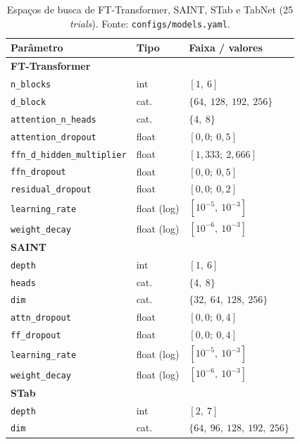 \begin{table}[htbp]
\centering\footnotesize
\caption[Espaços de busca --- arquiteturas de atenção]{Espaços de
busca de FT-Transformer, SAINT, STab e TabNet (25 \emph{trials}).
Fonte: \texttt{configs/\allowbreak models.\allowbreak yaml}.}
\label{tab:app-busca-atencao}
\begin{tabular}{lll}
\toprule
Parâmetro & Tipo & Faixa / valores \\
\midrule
\multicolumn{3}{l}{\textbf{FT-Transformer}} \\
\texttt{n\_blocks}                  & int   & $[1,\ 6]$ \\
\texttt{d\_block}                   & cat.  & $\{64,\ 128,\ 192,\ 256\}$ \\
\texttt{attention\_\allowbreak n\_\allowbreak heads}        & cat.  & $\{4,\ 8\}$ \\
\texttt{attention\_\allowbreak dropout}         & float & $[0{,}0;\ 0{,}5]$ \\
\texttt{ffn\_\allowbreak d\_\allowbreak hidden\_\allowbreak multiplier} & float & $[1{,}333;\ 2{,}666]$ \\
\texttt{ffn\_dropout}               & float & $[0{,}0;\ 0{,}5]$ \\
\texttt{residual\_\allowbreak dropout}          & float & $[0{,}0;\ 0{,}2]$ \\
\texttt{learning\_rate}             & float (log) & $[10^{-5},\ 10^{-3}]$ \\
\texttt{weight\_decay}              & float (log) & $[10^{-6},\ 10^{-3}]$ \\
\midrule
\multicolumn{3}{l}{\textbf{SAINT}} \\
\texttt{depth}          & int   & $[1,\ 6]$ \\
\texttt{heads}          & cat.  & $\{4,\ 8\}$ \\
\texttt{dim}            & cat.  & $\{32,\ 64,\ 128,\ 256\}$ \\
\texttt{attn\_dropout}  & float & $[0{,}0;\ 0{,}4]$ \\
\texttt{ff\_dropout}    & float & $[0{,}0;\ 0{,}4]$ \\
\texttt{learning\_rate} & float (log) & $[10^{-5},\ 10^{-3}]$ \\
\texttt{weight\_decay}  & float (log) & $[10^{-6},\ 10^{-3}]$ \\
\midrule
\multicolumn{3}{l}{\textbf{STab}} \\
\texttt{depth}          & int   & $[2,\ 7]$ \\
\texttt{dim}            & cat.  & $\{64,\ 96,\ 128,\ 192,\ 256\}$ \\

\end{tabular}
\end{table}
